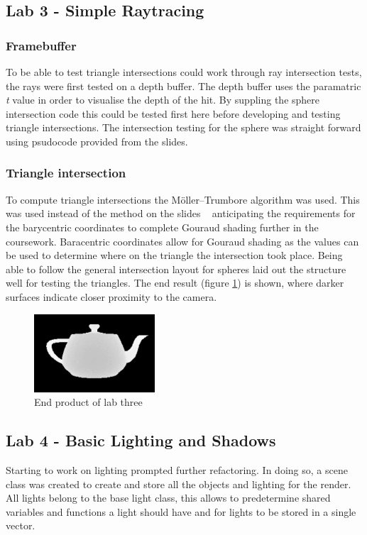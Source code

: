 \documentclass{article}
\begin{document}
\subsection{Lab 3 - Simple Raytracing}
\subsubsection{Framebuffer}
To be able to test triangle intersections could work through ray intersection tests, the rays were first tested on a depth buffer. The depth buffer uses the paramatric \textit{t} value in order to visualise the depth of the hit. By suppling the sphere intersection code this could be tested first here before developing and testing triangle intersections. The intersection testing for the sphere was straight forward using psudocode provided from the slides.

\subsubsection{Triangle intersection}
To compute triangle intersections the Möller–Trumbore algorithm was used. This was used instead of the method on the slides ~\cite{ref:lec04} anticipating the requirements for the barycentric coordinates to complete Gouraud shading further in the coursework. Baracentric coordinates allow for Gouraud shading as the values can be used to determine where on the triangle the intersection took place. Being able to follow the general intersection layout for spheres laid out the structure well for testing the triangles. The end result (figure \ref{fig:depthmap}) is shown, where darker surfaces indicate closer proximity to the camera.

\begin{figure}[h]
\centering
\includegraphics[width=0.4\textwidth]{depthmap}
\captionsetup{justification=centering,margin=0.5cm}
\caption{End product of lab three}
\label{fig:depthmap}
\end{figure}

\subsection{Lab 4 - Basic Lighting and Shadows}
Starting to work on lighting prompted further refactoring. In doing so, a scene class was created to create and store all the objects and lighting for the render. All lights belong to the base light class, this allows to predetermine shared variables and functions a light should have and for lights to be stored in a single vector.
\end{document}
